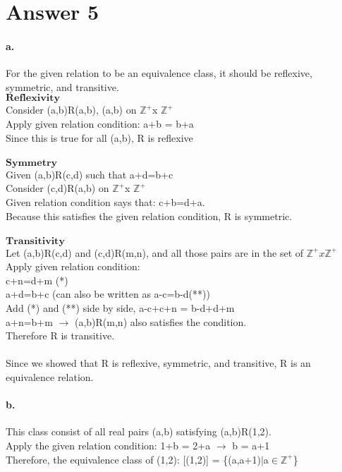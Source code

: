 \documentclass[11pt]{article}
\newcommand{\setZp}{\mathbb{Z}^+}
\begin{document}
\section*{Answer 5}
\paragraph{a.}
For the given relation to be an equivalence class, it should be reflexive, symmetric, and transitive.\\
$\textbf{Reflexivity}$\\
Consider (a,b)R(a,b), (a,b) on $\setZp$x $\setZp$\\
Apply given relation condition: a+b = b+a\\
Since this is true for all (a,b), R is reflexive\\\\
$\textbf{Symmetry}$\\
Given (a,b)R(c,d) such that a+d=b+c\\
Consider (c,d)R(a,b) on $\setZp$x $\setZp$\\
Given relation condition says that: c+b=d+a.\\
Because this satisfies the given relation condition, R is symmetric.\\\\
$\textbf{Transitivity}$\\
Let (a,b)R(c,d) and (c,d)R(m,n), and all those pairs are in the set of $\setZp x\setZp$\\
Apply given relation condition:\\
c+n=d+m (*)\\
a+d=b+c (can also be written as a-c=b-d(**))\\
Add (*) and (**) side by side,
a-c+c+n = b-d+d+m\\
a+n=b+m $\rightarrow$ (a,b)R(m,n) also satisfies the condition.\\
Therefore R is transitive.\\\\
Since we showed that R is reflexive, symmetric, and transitive, R is an equivalence relation.\\
\paragraph{b.}
This class consist of all real pairs (a,b) satisfying (a,b)R(1,2).\\
Apply the given relation condition: 1+b = 2+a $\rightarrow$ b = a+1\\
Therefore, the equivalence class of (1,2): [(1,2)] = \{(a,a+1)$|$a$\in\setZp$\}
\end{document}
